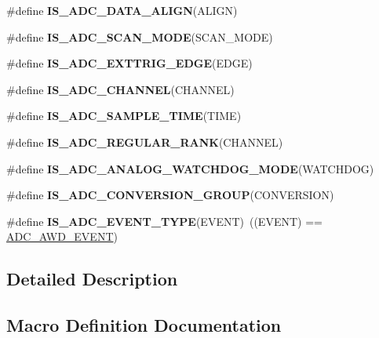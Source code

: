 \begin{DoxyCompactItemize}
\#define {\bfseries I\+S\+\_\+\+A\+D\+C\+\_\+\+D\+A\+T\+A\+\_\+\+A\+L\+I\+GN}(A\+L\+I\+GN)
\item 
\#define {\bfseries I\+S\+\_\+\+A\+D\+C\+\_\+\+S\+C\+A\+N\+\_\+\+M\+O\+DE}(S\+C\+A\+N\+\_\+\+M\+O\+DE)
\item 
\#define {\bfseries I\+S\+\_\+\+A\+D\+C\+\_\+\+E\+X\+T\+T\+R\+I\+G\+\_\+\+E\+D\+GE}(E\+D\+GE)
\item 
\#define {\bfseries I\+S\+\_\+\+A\+D\+C\+\_\+\+C\+H\+A\+N\+N\+EL}(C\+H\+A\+N\+N\+EL)
\item 
\#define {\bfseries I\+S\+\_\+\+A\+D\+C\+\_\+\+S\+A\+M\+P\+L\+E\+\_\+\+T\+I\+ME}(T\+I\+ME)
\item 
\#define {\bfseries I\+S\+\_\+\+A\+D\+C\+\_\+\+R\+E\+G\+U\+L\+A\+R\+\_\+\+R\+A\+NK}(C\+H\+A\+N\+N\+EL)
\item 
\#define {\bfseries I\+S\+\_\+\+A\+D\+C\+\_\+\+A\+N\+A\+L\+O\+G\+\_\+\+W\+A\+T\+C\+H\+D\+O\+G\+\_\+\+M\+O\+DE}(W\+A\+T\+C\+H\+D\+OG)
\item 
\#define {\bfseries I\+S\+\_\+\+A\+D\+C\+\_\+\+C\+O\+N\+V\+E\+R\+S\+I\+O\+N\+\_\+\+G\+R\+O\+UP}(C\+O\+N\+V\+E\+R\+S\+I\+ON)
\item 
\mbox{\label{group___a_d_c___private___macros_ga26fd0ba397566ade5d960ff29bccbc31}} 
\#define {\bfseries I\+S\+\_\+\+A\+D\+C\+\_\+\+E\+V\+E\+N\+T\+\_\+\+T\+Y\+PE}(E\+V\+E\+NT)~((E\+V\+E\+NT) == \hyperlink{group___a_d_c___event__type_ga2d1d545ea1bfecba7a7081be6ef2cb93}{A\+D\+C\+\_\+\+A\+W\+D\+\_\+\+E\+V\+E\+NT})
\end{DoxyCompactItemize}


\subsection{Detailed Description}


\subsection{Macro Definition Documentation}
\mbox{\label{group___a_d_c___private___macros_gac7ab87a3ab932eed1b3ac5faad4e3aa9}} 
